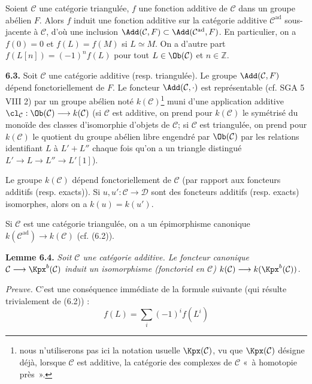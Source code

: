 Soient \(\mathcal C\) une catégorie triangulée, \(f\) une fonction additive de \(\mathcal C\) dans un groupe abélien \(F\). Alors \(f\) induit une fonction additive sur la catégorie additive \(\mathcal C^{\mathrm{ad}}\) sous-jacente à \(\mathcal C\), d'où une inclusion \(\Add(\mathcal C,F)\subset\Add(\mathcal C^{\mathrm{ad}},F)\). En particulier, on a \(f(0)=0\) et \(f(L)=f(M)\) si \(L\simeq M\). On a d'autre part \(f(L[n])=(-1)^n f(L)\) pour tout \(L\in\Ob(\mathcal C)\) et \(n\in\mathbb Z\).

\textbf{6.3.} Soit \(\mathcal C\) une catégorie additive (resp. triangulée). Le groupe \(\Add(\mathcal C,F)\) dépend fonctoriellement de \(F\). Le foncteur \(\Add(\mathcal C,\cdot)\) est représentable (cf. SGA 5 VIII 2) par un groupe abélien noté \(k(\mathcal C)\)\footnote{nous n'utiliserons pas ici la notation usuelle \(\Kpx(\mathcal C)\), vu que \(\Kpx(\mathcal C)\) désigne déjà, lorsque \(\mathcal C\) est additive, la catégorie des complexes de \(\mathcal C\) «~à homotopie près~».} muni d'une application additive \(\cl_{\mathcal C}:\Ob(\mathcal C)\longrightarrow k(\mathcal C)\) (si \(\mathcal C\) est additive, on prend pour \(k(\mathcal C)\) le symétrisé du monoïde des classes d'isomorphie d'objets de \(\mathcal C\); si \(\mathcal C\) est triangulée, on prend pour \(k(\mathcal C)\) le quotient du groupe abélien libre engendré par \(\Ob(\mathcal C)\) par les relations identifiant \(L\) à \(L'+L''\) chaque fois qu'on a un triangle distingué \(L'\longrightarrow L\longrightarrow L''\longrightarrow L'[1]\)).

Le groupe \(k(\mathcal C)\) dépend fonctoriellement de \(\mathcal C\) (par rapport aux foncteurs additifs (resp. exacts)). Si \(u,u':\mathcal C\to\mathcal D\) sont des foncteurs additifs (resp. exacts) isomorphes, alors on a \(k(u)=k(u')\).

Si \(\mathcal C\) est une catégorie triangulée, on a un épimorphisme canonique \(k(\mathcal C^{\mathrm{ad}})\longrightarrow k(\mathcal C)\) (cf. (6.2)).

\textbf{Lemme 6.4.} \emph{Soit \(\mathcal C\) une catégorie additive. Le foncteur canonique \(\mathcal C\longrightarrow\Kpx^b(\mathcal C)\) induit un isomorphisme (fonctoriel en \(\mathcal C\)) \(k(\mathcal C)\longrightarrow k(\Kpx^b(\mathcal C))\).}

\emph{Preuve.} C'est une conséquence immédiate de la formule suivante (qui résulte trivialement de (6.2)) :
\begin{equation}\tag{6.4.1}
  f(L)=\sum_i (-1)^i f(L^i)
\end{equation}
